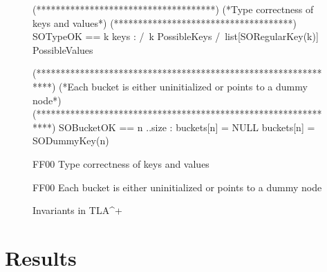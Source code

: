 \documentclass{uit-thesis}
\begin{document}
\begin{figure}
\begin{tla}
(*************************************)
(*Type correctness of keys and values*)
(*************************************)
SOTypeOK == \forall k \in keys :
                /\ k \in PossibleKeys
                /\ list[SORegularKey(k)] \in PossibleValues

(***************************************************************)
(*Each bucket is either uninitialized or points to a dummy node*)
(***************************************************************)
SOBucketOK == \forall n ..size :
                    \/ buckets[n] = NULL
                    \/ buckets[n] = SODummyKey(n)
\end{tla}
\begin{tlatex}
\begin{lcom}{0}%
\begin{cpar}{0}{F}{F}{0}{0}{}%
Type correctness of keys and values
\end{cpar}%
\end{lcom}%
%
%
%
\@pvspace{8.0pt}%
\begin{lcom}{0}%
\begin{cpar}{0}{F}{F}{0}{0}{}%
Each bucket is either uninitialized or points to a dummy node
\end{cpar}%
\end{lcom}%
%
%
%
\end{tlatex}
\caption{Invariants in TLA^+}
\label{fig:invariants}
\end{figure}


\chapter{Results}\label{ch:results}
\end{document}
